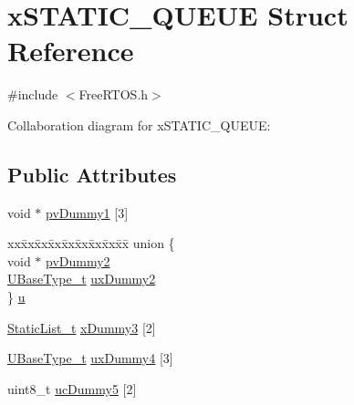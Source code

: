 \hypertarget{structx_s_t_a_t_i_c___q_u_e_u_e}{}\section{x\+S\+T\+A\+T\+I\+C\+\_\+\+Q\+U\+E\+UE Struct Reference}
\label{structx_s_t_a_t_i_c___q_u_e_u_e}


{\ttfamily \#include $<$Free\+R\+T\+O\+S.\+h$>$}



Collaboration diagram for x\+S\+T\+A\+T\+I\+C\+\_\+\+Q\+U\+E\+UE\+:
\subsection*{Public Attributes}
\begin{DoxyCompactItemize}
\item 
void $\ast$ \hyperlink{structx_s_t_a_t_i_c___q_u_e_u_e_aacf22a66a8d723648995692ec77ee416}{pv\+Dummy1} \mbox{[}3\mbox{]}
\item 
\begin{tabbing}
xx\=xx\=xx\=xx\=xx\=xx\=xx\=xx\=xx\=\kill
union \{\\
\>void $\ast$ \hyperlink{structx_s_t_a_t_i_c___q_u_e_u_e_adb72a02b22a558f6fad381d65af5ac68}{pvDummy2}\\
\>\hyperlink{externals_2freertos_2portable_2_g_c_c_2_a_r_m___c_m0_2portmacro_8h_a646f89d4298e4f5afd522202b11cb2e6}{UBaseType\_t} \hyperlink{structx_s_t_a_t_i_c___q_u_e_u_e_ab4e6a2a0bb59ba54d05927e99afd553f}{uxDummy2}\\
\} \hyperlink{structx_s_t_a_t_i_c___q_u_e_u_e_a9916da58656fed1a08b751ce05ddd3e7}{u}\\

\end{tabbing}\item 
\hyperlink{externals_2freertos_2include_2_free_r_t_o_s_8h_a9735ad9101a2bd25f83a62089a4acee6}{Static\+List\+\_\+t} \hyperlink{structx_s_t_a_t_i_c___q_u_e_u_e_add0de93e08b632124122850bcd543597}{x\+Dummy3} \mbox{[}2\mbox{]}
\item 
\hyperlink{externals_2freertos_2portable_2_g_c_c_2_a_r_m___c_m0_2portmacro_8h_a646f89d4298e4f5afd522202b11cb2e6}{U\+Base\+Type\+\_\+t} \hyperlink{structx_s_t_a_t_i_c___q_u_e_u_e_a502854697731754ce445f6503d14b127}{ux\+Dummy4} \mbox{[}3\mbox{]}
\item 
uint8\+\_\+t \hyperlink{structx_s_t_a_t_i_c___q_u_e_u_e_a541c5044376603540cc3c9cabcbdc5e6}{uc\+Dummy5} \mbox{[}2\mbox{]}
\end{DoxyCompactItemize}


